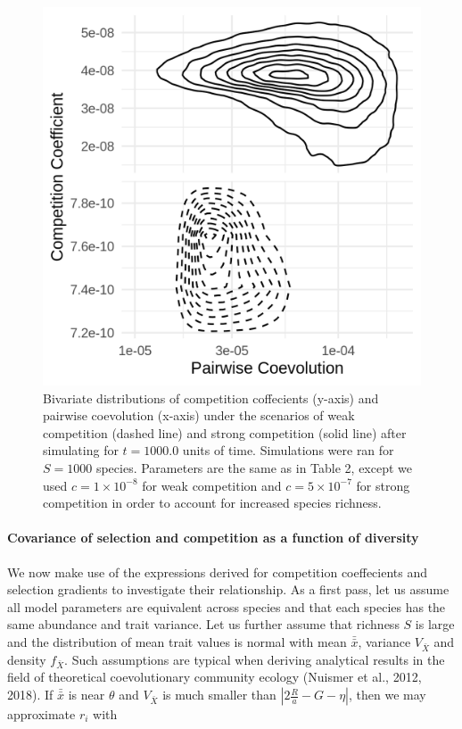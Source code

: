 \documentclass[]{elsarticle} %
\begin{document}
\begin{figure}

{\centering \includegraphics[width=0.6\linewidth]{on_pl} 

}

\caption{\label{net}Bivariate distributions of competition coffecients (y-axis) and pairwise coevolution (x-axis) under the scenarios of weak competition (dashed line) and strong competition (solid line) after simulating for $t=1000.0$ units of time. Simulations were ran for $S=1000$ species. Parameters are the same as in Table 2, except we used $c=1\times 10^{-8}$ for weak competition and $c=5\times 10^{-7}$ for strong competition in order to account for increased species richness.}\label{fig:unnamed-chunk-8}
\end{figure}

\paragraph{Covariance of selection and competition as a function of diversity}

We now make use of the expressions derived for competition coeffecients
and selection gradients to investigate their relationship. As a first
pass, let us assume all model parameters are equivalent across species
and that each species has the same abundance and trait variance. Let us
further assume that richness \(S\) is large and the distribution of mean
trait values is normal with mean \(\bar{\bar x}\), variance
\(V_{\bar X}\) and density \(f_{\bar X}\). Such assumptions are typical
when deriving analytical results in the field of theoretical
coevolutionary community ecology (Nuismer et al., 2012, 2018). If
\(\bar{\bar x}\) is near \(\theta\) and \(V_{\bar X}\) is much smaller
than \(|2\frac{R}{a}-G-\eta|\), then we may approximate \(r_i\) with
\end{document}
